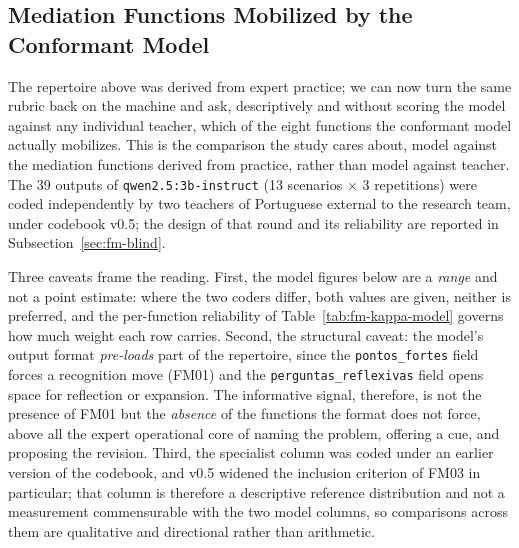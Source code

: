 \documentclass{sbc2023}%
\begin{document}
\subsection{Mediation Functions Mobilized by the Conformant Model}
\label{sec:fm-model}

The repertoire above was derived from expert practice; we can now turn the same rubric back on the machine and ask, descriptively and without scoring the model against any individual teacher, which of the eight functions the conformant model actually mobilizes. This is the comparison the study cares about, model against the mediation functions derived from practice, rather than model against teacher. The 39 outputs of \texttt{qwen2.5:3b-instruct} (13 scenarios $\times$ 3 repetitions) were coded independently by two teachers of Portuguese external to the research team, under codebook v0.5; the design of that round and its reliability are reported in Subsection~\ref{sec:fm-blind}.

Three caveats frame the reading. First, the model figures below are a \textit{range} and not a point estimate: where the two coders differ, both values are given, neither is preferred, and the per-function reliability of Table~\ref{tab:fm-kappa-model} governs how much weight each row carries. Second, the structural caveat: the model's output format \textit{pre-loads} part of the repertoire, since the \texttt{pontos\_fortes} field forces a recognition move (FM01) and the \texttt{perguntas\_reflexivas} field opens space for reflection or expansion. The informative signal, therefore, is not the presence of FM01 but the \textit{absence} of the functions the format does not force, above all the expert operational core of naming the problem, offering a cue, and proposing the revision. Third, the specialist column was coded under an earlier version of the codebook, and v0.5 widened the inclusion criterion of FM03 in particular; that column is therefore a descriptive reference distribution and not a measurement commensurable with the two model columns, so comparisons across them are qualitative and directional rather than arithmetic.
\end{document}
